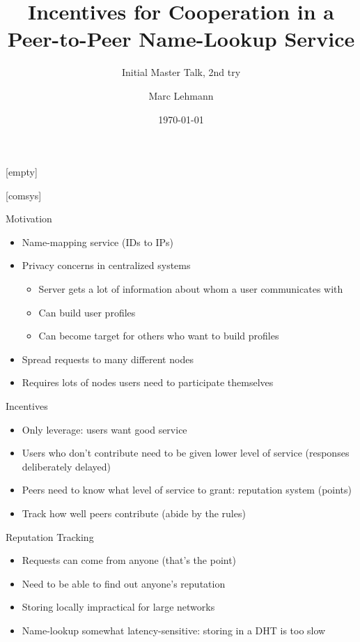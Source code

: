\documentclass[presentation,english,usenames,dvipsnames]{beamer}
\title[Peer-to-Peer Incentives]{Incentives for Cooperation in a Peer-to-Peer
Name-Lookup Service}
\author{Marc Lehmann}
\subtitle{Initial Master Talk, 2nd try}
\date{\today}
\begin{document}
[empty]
\begin{frame}
  \titlepage
\end{frame}

[comsys]

\begin{frame}{Motivation}
  \begin{itemize}
    \item Name-mapping service (IDs to IPs)
    \item Privacy concerns in centralized systems
    \begin{itemize}
      \item Server gets a lot of information about whom a user communicates with
      \item Can build user profiles
      \item Can become target for others who want to build profiles
    \end{itemize}
    \item Spread requests to many different nodes
    \item Requires lots of nodes \rightarrow users need to participate
          themselves
  \end{itemize}
\end{frame}

\begin{frame}{Incentives}
  \begin{itemize}
    \item Only leverage: users want good service
    \item Users who don't contribute need to be given lower level of service
          (responses deliberately delayed)
    \item Peers need to know what level of service to grant: reputation system
          (points)
    \item Track how well peers contribute (abide by the rules)
  \end{itemize}
\end{frame}

\begin{frame}{Reputation Tracking}
  \begin{itemize}
    \item Requests can come from anyone (that's the point)
    \item Need to be able to find out anyone's reputation
    \item Storing locally impractical for large networks
    \item Name-lookup somewhat latency-sensitive: storing in a DHT is too slow
  \end{itemize}
\end{frame}
\end{document}
